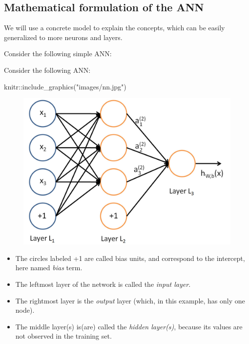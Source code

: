 \documentclass[
  letterpaper,
  DIV=11,
  numbers=noendperiod,
  oneside]{scrartcl}
\newenvironment{Shaded}{\begin{snugshade}}{\end{snugshade}}
\newcommand{\FunctionTok}[1]{\textcolor[rgb]{0.28,0.35,0.67}{#1}}
\newcommand{\NormalTok}[1]{\textcolor[rgb]{0.00,0.23,0.31}{#1}}
\newcommand{\SpecialCharTok}[1]{\textcolor[rgb]{0.37,0.37,0.37}{#1}}
\newcommand{\StringTok}[1]{\textcolor[rgb]{0.13,0.47,0.30}{#1}}
\providecommand{\tightlist}{%
  \setlength{\itemsep}{0pt}\setlength{\parskip}{0pt}}\usepackage{longtable,booktabs,array}
\begin{document}
\hypertarget{mathematical-formulation-of-the-ann}{%
\subsection{Mathematical formulation of the
ANN}\label{mathematical-formulation-of-the-ann}}

We will use a concrete model to explain the concepts, which can be
easily generalized to more neurons and layers.

Consider the following simple ANN:

Consider the following ANN:

\begin{Shaded}
\begin{Highlighting}[]
\NormalTok{knitr}\SpecialCharTok{::}\FunctionTok{include\_graphics}\NormalTok{(}\StringTok{"images/nn.jpg"}\NormalTok{)}
\end{Highlighting}
\end{Shaded}

\begin{figure}[H]

{\centering \includegraphics[width=1\textwidth,height=\textheight]{images/nn.jpg}

}

\end{figure}

\begin{itemize}
\tightlist
\item
  The circles labeled +1 are called bias units, and correspond to the
  intercept, here named \emph{bias} term.
\item
  The leftmost layer of the network is called the \emph{input layer}.
\item
  The rightmost layer is the \emph{output} layer (which, in this
  example, has only one node).
\item
  The middle layer(s) is(are) called the \emph{hidden layer(s)}, because
  its values are not observed in the training set.
\end{itemize}
\end{document}
